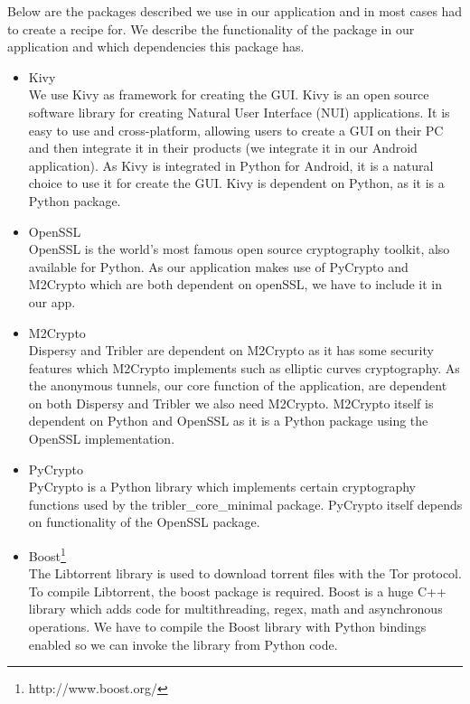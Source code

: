 		Below are the packages described we use in our application and in most cases had to create a recipe for. We describe the functionality of the package in our application and which dependencies this package has.
	
		\begin{itemize}
		
			\item Kivy\\
			We use Kivy as framework for creating the GUI. Kivy is an open source software library for creating Natural User Interface (NUI) applications. It is easy to use and cross-platform, allowing users to create a GUI on their PC and then integrate it in their products (we integrate it in our Android application). As Kivy is integrated in Python for Android, it is a natural choice to use it for create the GUI. Kivy is dependent on Python, as it is a Python package. 
		
			\item OpenSSL\\
			OpenSSL is the world's most famous open source cryptography toolkit, also available for Python. As our application makes use of PyCrypto and M2Crypto which are both dependent on openSSL, we have to include it in our app.
		
			\item M2Crypto\\
			Dispersy and Tribler are dependent on M2Crypto as it has some security features which M2Crypto implements such as elliptic curves cryptography. As the anonymous tunnels, our core function of the application, are dependent on both Dispersy and Tribler we also need M2Crypto. M2Crypto itself is dependent on Python and OpenSSL as it is a Python package using the OpenSSL implementation.
		
			\item PyCrypto\\
			PyCrypto is a Python library which implements certain cryptography functions used by the tribler\_core\_minimal package. PyCrypto itself depends on functionality of the OpenSSL package.
		
			\item Boost\footnote{http://www.boost.org/}\\
			The Libtorrent library is used to download torrent files with the Tor protocol. To compile Libtorrent, the boost package is required. Boost is a huge C++ library which adds code for multithreading, regex, math and asynchronous operations. We have to compile the Boost library with Python bindings enabled so we can invoke the library from Python code.
		

\end{itemize}

